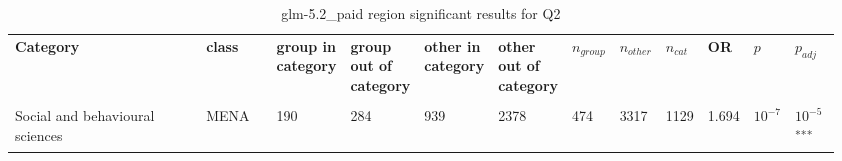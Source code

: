 \clearpage
\begin{landscape}
\begin{table}[p]
\centering
\caption{glm-5.2_paid region significant results for Q2}
\label{tab:appendix-significant-q2-glm-5.2_paid-region}
\scriptsize
\renewcommand{\arraystretch}{0.92}
\setlength{\tabcolsep}{2pt}
\begin{tabular}{p{0.35\linewidth}p{0.1\linewidth}p{0.05\linewidth}p{0.05\linewidth}p{0.05\linewidth}p{0.05\linewidth}p{0.05\linewidth}p{0.05\linewidth}p{0.05\linewidth}p{0.05\linewidth}p{0.05\linewidth}p{0.06\linewidth}}
\toprule
\textbf{Category} & \textbf{class} & \textbf{group in category} & \textbf{group out of category} & \textbf{other in category} & \textbf{other out of category} & \textbf{$n_{group}$} & \textbf{$n_{other}$} & \textbf{$n_{cat}$} & \textbf{OR} & \textbf{$p$} & \textbf{$p_{adj}$} \\\\
\midrule
Social and behavioural sciences & MENA & 190 & 284 & 939 & 2378 & 474 & 3317 & 1129 & 1.694 & $10^{-7}$ & $10^{-5}$\textsuperscript{***} \\
\bottomrule
\end{tabular}
\end{table}
\end{landscape}
